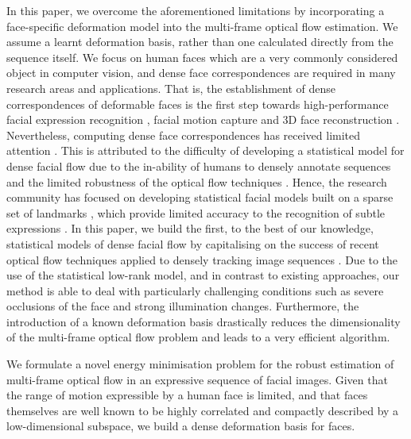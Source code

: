 In this paper, we overcome the aforementioned limitations by incorporating a face-specific 
deformation model into the multi-frame optical flow estimation. We assume a learnt 
deformation basis, rather than one calculated directly from the sequence itself. We 
focus on human faces which are a very commonly considered object in computer vision, 
and dense face correspondences are required in many research areas and applications. 
That is, the establishment of dense correspondences of deformable faces is the first step 
towards high-performance facial expression recognition \cite{koelstra2010dynamic}, facial 
motion capture \cite{Beeler:2011ey} and 3D face reconstruction \cite{garg2013dense}. 
Nevertheless, computing dense face correspondences has received limited attention 
\cite{decarlo2000optical,yacoob1996recognizing}. This is attributed to the difficulty of 
developing a statistical model for dense facial flow due to the in-ability of humans to 
densely annotate sequences and the limited robustness of the optical flow techniques 
\cite{decarlo2000optical}. Hence, the research community has focused on developing 
statistical facial models built on a sparse set of landmarks \cite{xiong2013supervised}, 
which provide limited accuracy to the recognition of subtle expressions \cite{li2013spontaneous}. 
In this paper, we build the first, to the best of our knowledge, statistical models of 
dense facial flow by capitalising on the success of recent optical flow techniques applied to 
densely tracking image sequences \cite{garg2013variational}. Due to the use of the statistical 
low-rank model, and in contrast to existing approaches, our method is able to deal with 
particularly challenging conditions such as severe occlusions of the face and strong 
illumination changes. Furthermore, the introduction of a known deformation basis drastically 
reduces the dimensionality of the multi-frame optical flow problem and leads to a 
very efficient algorithm.

We formulate a novel energy minimisation problem for the robust estimation of 
multi-frame optical flow in an expressive sequence of facial images.
Given that the range of motion expressible by a human face is limited, and that
faces themselves are well known to be highly correlated and compactly described 
by a low-dimensional subspace, we build a dense deformation 
basis for faces.

